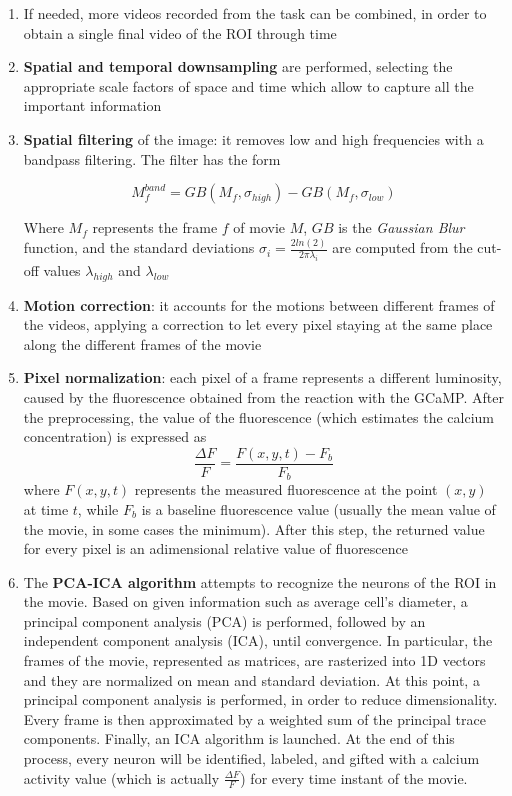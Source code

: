 \documentclass[12pt, a4paper]{article}
\begin{document}
\begin{enumerate}
	
	\item If needed, more videos recorded from the task can be combined, in order to obtain a single final video of the ROI through time
	
	\item \textbf{Spatial and temporal downsampling} are performed, selecting the appropriate scale factors of space and time which allow to capture all the important information
	
	\item \textbf{Spatial filtering} of the image: it removes low and high frequencies with a bandpass filtering. The filter has the form
	
	$$ M_f^{band} = GB(M_f,\sigma_{high}) - GB(M_f,\sigma_{low})$$
	
	Where $M_f$  represents the frame $f$ of movie $M$, $GB$ is the \textit{Gaussian Blur} function, and the standard deviations $ \sigma_i = \frac{2 ln(2)}{2 \pi \lambda_i}$ are computed from the cut-off values $ \lambda_{high}$ and $ \lambda_{low}$
	
	\item \textbf{Motion correction}: it accounts for the motions between different frames of the videos, applying a correction to let every pixel staying at the same place along the different frames of the movie
	
	\item \textbf{Pixel normalization}: each pixel of a frame represents a different luminosity, caused by the fluorescence obtained from the reaction with the GCaMP. After the preprocessing, the value of the fluorescence (which estimates the calcium concentration) is expressed as 
	$$\frac{\Delta F }{F} = \frac{F(x,y,t) - F_b}{F_b}$$
	where $F(x,y,t)$ represents the measured fluorescence at the point $(x,y)$ at time $t$, while $F_b$ is a baseline fluorescence value (usually the mean value of the movie, in some cases the minimum). After this step, the returned value for every pixel is an adimensional relative value of fluorescence
	
	\item The \textbf{PCA-ICA algorithm} attempts to recognize the neurons of the ROI in the movie. Based on given information such as average cell's diameter, a principal component analysis (PCA) is performed, followed by an independent component analysis (ICA), until convergence. In particular, the frames of the movie, represented as matrices, are rasterized into 1D vectors and they are normalized on mean and standard deviation. At this point, a principal component analysis is performed, in order to reduce dimensionality. Every frame is then approximated by a weighted sum of the principal trace components. Finally, an ICA algorithm is launched. At the end of this process, every neuron will be identified, labeled, and gifted with a calcium activity value (which is actually  $\frac{\Delta F }{F}$) for every time instant of the movie. 
	

\end{enumerate}
\end{document}
